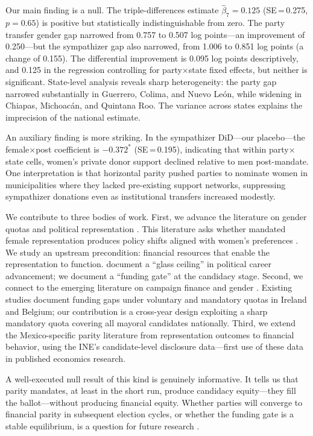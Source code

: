 \documentclass[12pt]{article}
\begin{document}
Our main finding is a null. The triple-differences estimate $\hat{\beta}_7 = 0.125$ (SE\,=\,0.275, $p = 0.65$) is positive but statistically indistinguishable from zero. The party transfer gender gap narrowed from 0.757 to 0.507 log points---an improvement of 0.250---but the sympathizer gap also narrowed, from 1.006 to 0.851 log points (a change of 0.155). The differential improvement is 0.095 log points descriptively, and 0.125 in the regression controlling for party$\times$state fixed effects, but neither is significant. State-level analysis reveals sharp heterogeneity: the party gap narrowed substantially in Guerrero, Colima, and Nuevo Le\'on, while widening in Chiapas, Michoac\'an, and Quintana Roo. The variance across states explains the imprecision of the national estimate.

An auxiliary finding is more striking. In the sympathizer DiD---our placebo---the female$\times$post coefficient is $-0.372^{*}$ (SE\,=\,0.195), indicating that within party$\times$state cells, women's private donor support declined relative to men post-mandate. One interpretation is that horizontal parity pushed parties to nominate women in municipalities where they lacked pre-existing support networks, suppressing sympathizer donations even as institutional transfers increased modestly.

We contribute to three bodies of work. First, we advance the literature on gender quotas and political representation \citep{chattopadhyay2004, pande2003, besley2017, casas2017}. This literature asks whether mandated female representation produces policy shifts aligned with women's preferences \citep{clayton2023}. We study an upstream precondition: financial resources that enable the representation to function. \citet{folke2016} document a ``glass ceiling'' in political career advancement; we document a ``funding gate'' at the candidacy stage. Second, we connect to the emerging literature on campaign finance and gender \citep{buckley2023, sudulich2025, rydzewska2026}. Existing studies document funding gaps under voluntary and mandatory quotas in Ireland and Belgium; our contribution is a cross-year design exploiting a sharp mandatory quota covering all mayoral candidates nationally. Third, we extend the Mexico-specific parity literature \citep{piscopo2017, piscopo2023, baldez2004, htun2002, jones2009} from representation outcomes to financial behavior, using the INE's candidate-level disclosure data---first use of these data in published economics research.

A well-executed null result of this kind is genuinely informative. It tells us that parity mandates, at least in the short run, produce candidacy equity---they fill the ballot---without producing financial equity. Whether parties will converge to financial parity in subsequent election cycles, or whether the funding gate is a stable equilibrium, is a question for future research \citep{krook2009}.
\end{document}

